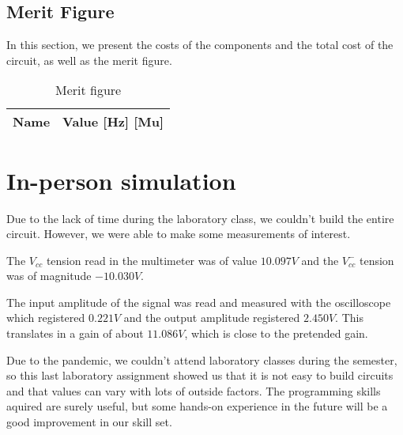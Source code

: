 \subsection{Merit Figure}
In this section, we present the costs of the components and the total cost of the circuit, as well as the merit figure.

 \begin{table}[h]
  \centering
  \begin{tabular}{|l|r|}
    \hline    
    {\bf Name} & {\bf Value [Hz] [Mu]} \\ \hline
    
  \end{tabular}
  \caption{Merit figure}
  \label{tab:data3sim_sim}
\end{table}
\FloatBarrier

\section{In-person simulation}
\label{sec:irl}

Due to the lack of time during the laboratory class, we couldn't build the entire circuit. However, we were able to make some measurements of interest. \par
The $V_{cc}$ tension read in the multimeter was of value $10.097 V$ and the $V_{cc}^-$ tension was of magnitude $-10.030 V$. \par
The input amplitude of the signal was read and measured with the oscilloscope which registered $0.221 V$ and the output amplitude registered $2.450 V$. This translates in a gain of about $11.086V$, which is close to the pretended gain. \par
Due to the pandemic, we couldn't attend laboratory classes during the semester, so this last laboratory assignment showed us that it is not easy to build circuits and that values can vary with lots of outside factors. The programming skills aquired are surely useful, but some hands-on experience in the future will be a good improvement in our skill set.  




